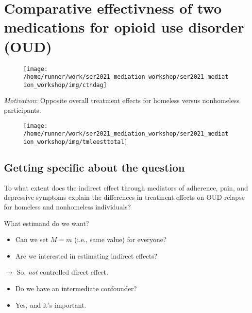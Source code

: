 \documentclass[
  12pt,
]{book}
\providecommand{\tightlist}{%
  \setlength{\itemsep}{0pt}\setlength{\parskip}{0pt}}
\theoremstyle{definition}
\theoremstyle{definition}
\theoremstyle{definition}
\newcommand{\1}{\mathbbm{1}}
\begin{document}
\hypertarget{comparative-effectivness-of-two-medications-for-opioid-use-disorder-oud}{%
\section{Comparative effectivness of two medications for opioid use disorder (OUD)}\label{comparative-effectivness-of-two-medications-for-opioid-use-disorder-oud}}

\begin{figure}

{\centering \texttt{[image: /home/runner/work/ser2021\_mediation\_workshop/ser2021\_mediation\_workshop/img/ctndag]} 

}

\end{figure}

\emph{Motivation}: Opposite overall treatment effects for homeless versus
nonhomeless participants.

\begin{figure}

{\centering \texttt{[image: /home/runner/work/ser2021\_mediation\_workshop/ser2021\_mediation\_workshop/img/tmleesttotal]} 

}

\end{figure}

\hypertarget{getting-specific-about-the-question}{%
\subsection{Getting specific about the question}\label{getting-specific-about-the-question}}

To what extent does the indirect effect through mediators of adherence, pain, and
depressive symptoms explain the differences in treatment effects on OUD relapse
for homeless and nonhomeless individuals?

What estimand do we want?

\begin{itemize}
\tightlist
\item
  Can we set \(M=m\) (i.e., same value) for everyone?
\item
  Are we interested in estimating indirect effects?
\end{itemize}

\(\rightarrow\) So, \emph{not} controlled direct effect.

\begin{itemize}
\tightlist
\item
  Do we have an intermediate confounder?
\item
  Yes, and it's important.
\end{itemize}
\end{document}

